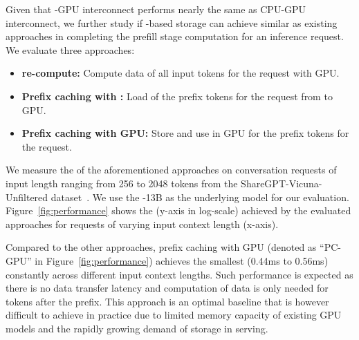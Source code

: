 Given that \cxl-GPU interconnect performs nearly the same as CPU-GPU interconnect, we further study if \cxl-based \kvcache storage can achieve similar \ttft as existing approaches in completing the prefill stage computation for an inference request. 
We evaluate three approaches:
\begin{itemize} 
\item \textbf{\kv re-compute:} Compute \kv data of all input tokens for the request with GPU. 
\item \textbf{Prefix caching with \cxl:} Load \kvcache of the prefix tokens for the request from \cxl to GPU. 
\item \textbf{Prefix caching with GPU:} Store and use \kvcache in GPU for the prefix tokens for the request.
\end{itemize}

We measure the \ttft of the aforementioned approaches on conversation requests of input length ranging from 256 to 2048 tokens from the ShareGPT-Vicuna-Unfiltered dataset~\cite{dataset}.
We use the -13B as the underlying model for our evaluation.
Figure~\ref{fig:performance} shows the \ttft (y-axis in log-scale) achieved by the evaluated approaches for requests of varying input context length (x-axis). 

Compared to the other approaches, prefix caching with GPU (denoted as ``PC-GPU'' in Figure~\ref{fig:performance}) achieves the smallest \ttft (0.44ms to 0.56ms) constantly across different input context lengths. Such performance is expected as there is no data transfer latency and computation of \kv data is only needed for tokens after the prefix. 
This approach is an optimal baseline that is however difficult to achieve in practice due to limited memory capacity of existing GPU models and the rapidly growing demand of \kvcache storage in \llm serving.

